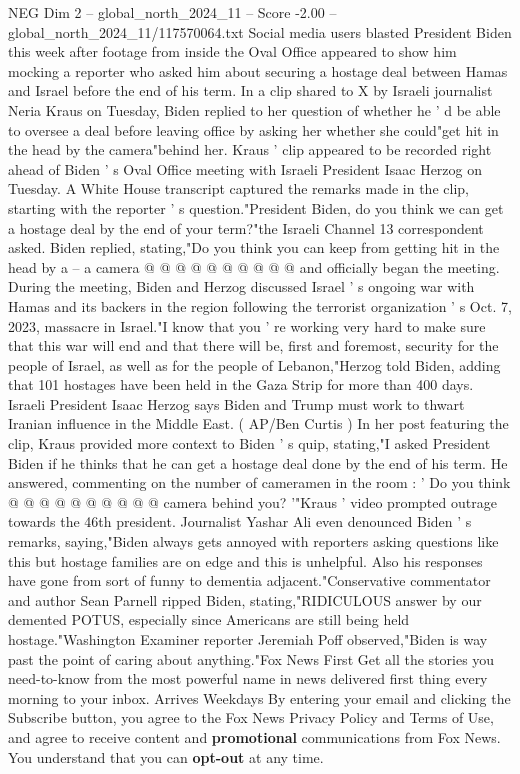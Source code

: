 \begin{textsample}{NEG Dim 2 – global\_north\_2024\_11 – Score -2.00 – global\_north\_2024\_11/117570064.txt}  \label{ex:f2_neg_089}
Social media users blasted President Biden this week after footage from inside the Oval Office appeared to show him mocking a reporter who asked him about securing a hostage deal between Hamas and Israel before the end of his term.
In a clip shared to X by Israeli journalist Neria Kraus on Tuesday, Biden replied to her question of whether he ' d be able to oversee a deal before leaving office by asking her whether she could"get hit in the head by the camera"behind her.
Kraus ' clip appeared to be recorded right ahead of Biden ' s Oval Office meeting with Israeli President Isaac Herzog on Tuesday.
A White House transcript captured the remarks made in the clip, starting with the reporter ' s question."President Biden, do you think we can get a hostage deal by the end of your term?"the Israeli Channel 13 correspondent asked.
Biden replied, stating,"Do you think you can keep from getting hit in the head by a -- a camera @ @ @ @ @ @ @ @ @ @ and officially began the meeting.
During the meeting, Biden and Herzog discussed Israel ' s ongoing war with Hamas and its backers in the region following the terrorist organization ' s Oct. 7, 2023, massacre in Israel."I know that you ' re working very hard to make sure that this war will end and that there will be, first and foremost, security for the people of Israel, as well as for the people of Lebanon,"Herzog told Biden, adding that 101 hostages have been held in the Gaza Strip for more than 400 days.
Israeli President Isaac Herzog says Biden and Trump must work to thwart Iranian influence in the Middle East. ( AP/Ben Curtis ) In her post featuring the clip, Kraus provided more context to Biden ' s quip, stating,"I asked President Biden if he thinks that he can get a hostage deal done by the end of his term.
He answered, commenting on the number of cameramen in the room : ' Do you think @ @ @ @ @ @ @ @ @ @ camera behind you? '"Kraus ' video prompted outrage towards the 46th president.
Journalist Yashar Ali even denounced Biden ' s remarks, saying,"Biden always gets annoyed with reporters asking questions like this but hostage families are on edge and this is unhelpful.
Also his responses have gone from sort of funny to dementia adjacent."Conservative commentator and author Sean Parnell ripped Biden, stating,"RIDICULOUS answer by our demented POTUS, especially since Americans are still being held hostage."Washington Examiner reporter Jeremiah Poff observed,"Biden is way past the point of caring about anything."Fox News First Get all the stories you need-to-know from the most powerful name in news delivered first thing every morning to your inbox.
Arrives Weekdays By entering your email and clicking the Subscribe button, you agree to the Fox News Privacy Policy and Terms of Use, and agree to receive content and \textbf{promotional} communications from Fox News.
You understand that you can \textbf{opt-out} at any time.

\end{textsample}
